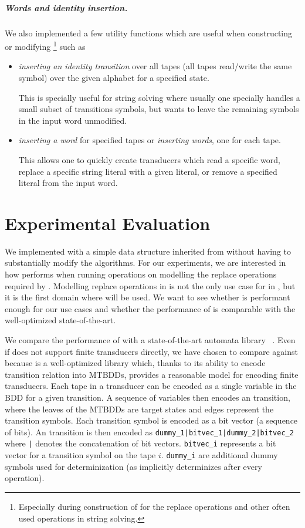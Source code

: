 \paragraph{Words and identity insertion.}
We also implemented a few utility functions which are useful when constructing or modifying \nfts\footnote{Especially during construction of \nfts for the replace operations and other often used operations in string solving.} such as
\begin{itemize}
  \item \emph{inserting an identity transition} over all tapes (all tapes read/write the same symbol) over the given alphabet for a specified state.

  This is specially useful for string solving where usually one specially handles a small subset of transitions symbols, but wants to leave the remaining symbols in the input word unmodified.

  \item \emph{inserting a word} for specified tapes or \emph{inserting words}, one for each tape.

  This allows one to quickly create transducers which read a specific word, replace a specific string literal with a given literal, or remove a specified literal from the input word.
\end{itemize}

\chapter{Experimental Evaluation}
\label{chap:experiments}

We implemented \nfts with a simple data structure inherited from \nfas without having to substantially modify the \nfa algorithms.
For our experiments, we are interested in how \mata performs when running operations on \nfts modelling the replace operations required by \noodler.
Modelling replace operations in \noodler is not the only use case for \nfts in \mata, but it is the first domain where \nfts will be used.
We want to see whether \mata is performant enough for our use cases and whether the performance of \mata is comparable with the well-optimized state-of-the-art.

We compare the performance of \mata with a state-of-the-art automata library \mona~\cite{mona}.
Even if \mona does not support finite transducers directly, we have chosen \mona to compare \mata against because \mona is a well-optimized library which, thanks to its ability to encode transition relation into MTBDDs, provides a reasonable model for encoding finite transducers.
Each tape in a transducer can be encoded as a single variable in the BDD for a given transition.
A sequence of variables then encodes an \nft transition, where the leaves of the MTBDDs are target states and edges represent the transition symbols.
Each transition symbol is encoded as a bit vector (a sequence of bits).
An \nft transition is then encoded as \texttt{dummy\_1|bitvec\_1|dummy\_2|bitvec\_2} where \texttt{|} denotes the concatenation of bit vectors. \texttt{bitvec\_i} represents a bit vector for a transition symbol on the tape $i$.
\texttt{dummy\_i} are additional dummy symbols used for determinization (as \mona implicitly determinizes after every operation).

